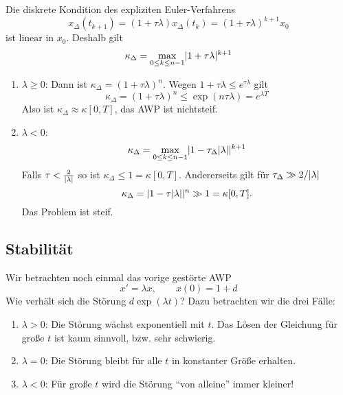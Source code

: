 Die diskrete Kondition des expliziten Euler-Verfahrens
\begin{equation*}
	x_\Delta(t_{k+1})
	=
	(1 + \tau \lambda) x_\Delta(t_k)
	=
	(1+\tau\lambda)^{k+1}x_0
\end{equation*}
ist linear in $x_0$. Deshalb gilt
\begin{equation*}
	\kappa_\Delta = \max_{0\le k \le n -1} \lvert 1+\tau \lambda \rvert^{k+1}
\end{equation*}

\begin{enumerate}[label=Fall \arabic*:, leftmargin=*]
	\item $\lambda \ge 0$: Dann ist $\kappa_\Delta = (1+\tau\lambda)^n$.
	Wegen $1 + \tau \lambda \le e^{\tau \lambda}$ gilt
	\begin{equation*}
		\kappa_\Delta = (1+\tau \lambda)^n \le \exp (n \tau \lambda) = e^{\lambda T}
	\end{equation*}
	Also ist $\kappa_\Delta \approx \kappa[0,T]$, das AWP ist nichtsteif.
	\item $\lambda < 0$: 
	\begin{equation*}
		\kappa_\Delta = \max_{0 \le k \le n -1} \lvert 1 - \tau_\Delta \lvert \lambda \rvert \rvert^{k+1}
	\end{equation*} 	
	Falls $\tau < \frac{2}{\lvert \lambda \rvert}$ so ist $\kappa_\Delta \le 1 = \kappa[0,T]$.
	Andererseits gilt für $\tau_\Delta \gg 2 / \lvert \lambda \rvert$
	\begin{equation*}
		\kappa_\Delta = \lvert 1-\tau \lvert \lambda \rvert \rvert^n \gg 1 = \kappa [0,T].
	\end{equation*}
	Das Problem ist steif.
\end{enumerate}

\subsection{Stabilität}

Wir betrachten noch einmal das vorige gestörte AWP
\begin{equation*}
	x' = \lambda x,
	\qquad
	x(0) = 1 + d
\end{equation*}
Wie verhält sich die Störung $d \exp (\lambda t)$? Dazu betrachten wir die drei Fälle:
\begin{enumerate}[label=Fall \arabic*:, leftmargin=*]
	\item $\lambda>0$: Die Störung wächst exponentiell mit $t$. Das Lösen der Gleichung für große $t$ ist kaum sinnvoll, bzw. sehr schwierig.
	\item $\lambda=0$: Die Störung bleibt für alle $t$ in konstanter Größe erhalten.
	\item $\lambda<0$: Für große $t$ wird die Störung \enquote{von alleine} immer kleiner!
\end{enumerate}

